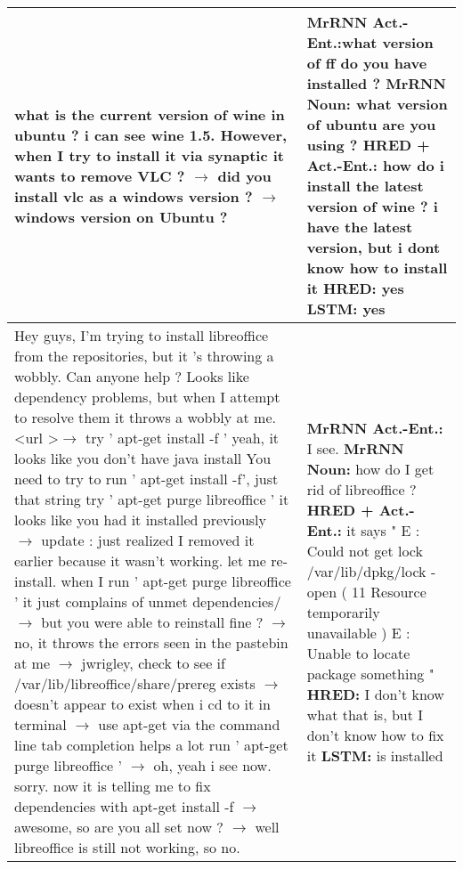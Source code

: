 \documentclass{article}
\begin{document}
\begin{table}[ht]
\begin{tabular}{p{65mm}|p{60mm}}
        what is the current version of wine in ubuntu ? i can see wine 1.5. However, when I try to install it via synaptic it wants to remove VLC ? $\rightarrow$ did you install vlc as a windows version ? $\rightarrow$ windows version on Ubuntu ? & \textbf{MrRNN Act.\@ -Ent.\@:}what version of ff do you have installed ? \newline \textbf{MrRNN Noun:} what version of ubuntu are you using ? \newline \textbf{HRED + Act.\@-Ent.\@:} how do i install the latest version of wine ? i have the latest version, but i dont know how to install it \newline \textbf{HRED:} yes \newline \textbf{LSTM:} yes \\ \hline 
        Hey guys, I'm trying to install libreoffice from the repositories, but it 's throwing a wobbly. Can anyone help ? Looks like dependency problems, but when I attempt to resolve them it throws a wobbly at me. \textless url \textgreater $\rightarrow$ try ' apt-get install -f ' yeah, it looks like you don't have java install You need to try to run ' apt-get install -f', just that string try ' apt-get purge libreoffice ' it looks like you had it installed previously $\rightarrow$ update : just realized I removed it earlier because it wasn't working. let me re-install. when I run ' apt-get purge libreoffice ' it just complains of unmet dependencies/ $\rightarrow$ but you were able to reinstall fine ? $\rightarrow$ no, it throws the errors seen in the pastebin at me $\rightarrow$ jwrigley, check to see if /var/lib/libreoffice/share/prereg exists $\rightarrow$ doesn't appear to exist when i cd to it in terminal $\rightarrow$ use apt-get via the command line tab completion helps a lot run ' apt-get purge libreoffice ' $\rightarrow$ oh, yeah i see now. sorry. now it is telling me to fix dependencies with apt-get install -f $\rightarrow$ awesome, so are you all set now ? $\rightarrow$ well libreoffice is still not working, so no. & \textbf{MrRNN Act.\@ -Ent.\@:} I see. \newline \textbf{MrRNN Noun:} how do I get rid of libreoffice ? \newline \textbf{HRED + Act.\@-Ent.\@:} it says " E : Could not get lock /var/lib/dpkg/lock - open ( 11 Resource temporarily unavailable ) E : Unable to locate package something " \newline \textbf{HRED:} I don't know what that is, but I don't know how to fix it \newline \textbf{LSTM:} is installed \\ \hline 

\end{tabular}
\end{table}
\end{document}

